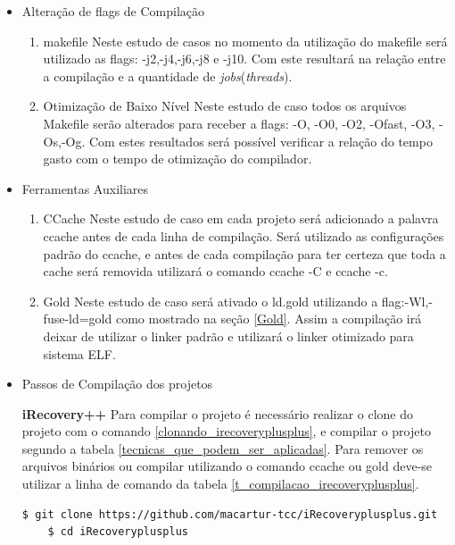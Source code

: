 \begin{itemize}
    \item Alteração de flags de Compilação
    \subitem 
        \begin{enumerate}
            \item makefile
                \subitem Neste estudo de casos no momento da utilização do makefile
 será utilizado as flags: -j2,-j4,-j6,-j8 e -j10. Com este resultará na relação entre
a compilação e a quantidade de \textit{jobs}(\textit{threads}).
            \item Otimização de Baixo Nível
                \subitem Neste estudo de caso todos os arquivos Makefile serão
 alterados para receber a flags: -O, -O0, -O2, -Ofast, -O3, -Os,-Og.
 Com estes resultados será possível verificar a relação do tempo gasto com
 o tempo de otimização do compilador.
        \end{enumerate}
    \item Ferramentas Auxiliares
        \begin{enumerate}
               \item CCache
                    \subitem Neste estudo de caso em cada projeto será adicionado
 a palavra ccache antes de cada linha de compilação. Será utilizado as
 configurações padrão do ccache, e antes de cada compilação para ter certeza
 que toda a cache será removida utilizará o comando ccache -C e ccache -c.
                \item Gold
                    \subitem Neste estudo de caso será ativado o ld.gold
 utilizando a flag:-Wl,-fuse-ld=gold como mostrado na seção \ref{Gold}. Assim  a
 compilação irá deixar de utilizar o linker padrão e utilizará o linker
 otimizado para sistema ELF.
        \end{enumerate}

    \item  Passos de Compilação dos projetos

        \subitem \textbf{iRecovery++}
        \subitem Para compilar o projeto é necessário realizar o clone do projeto
 com o comando \ref{clonando_irecoveryplusplus}, e compilar o projeto
 segundo a tabela \ref{tecnicas_que_podem_ser_aplicadas}.
 Para remover os arquivos binários ou compilar utilizando o comando ccache
 ou gold deve-se utilizar a linha de comando da tabela \ref{t_compilacao_irecoveryplusplus}.

\begin{lstlisting}[language=bash, caption={Clonado Projeto iRecoveryplusplus},
                  label=clonando_irecoveryplusplus]
    $ git clone https://github.com/macartur-tcc/iRecoveryplusplus.git 
    $ cd iRecoveryplusplus
\end{lstlisting}



\end{itemize}
